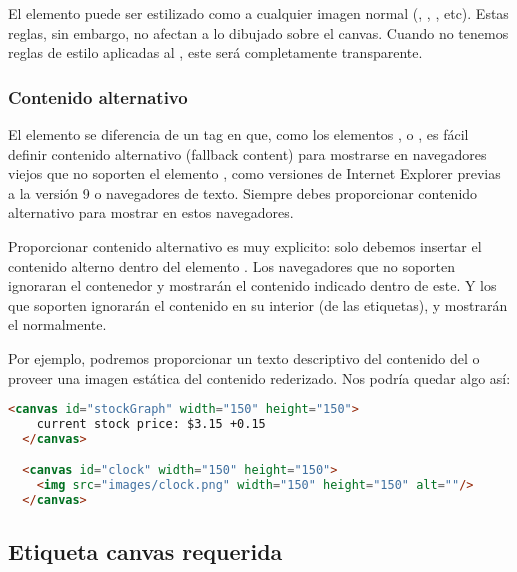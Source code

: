 El elemento  puede ser estilizado como a cualquier imagen normal (, , , etc). Estas reglas, sin embargo, no afectan a lo dibujado sobre el canvas. Cuando no tenemos reglas de estilo aplicadas al , este será completamente transparente.


\subsubsection{Contenido alternativo}

El elemento  se diferencia de un tag  en que, como los elementos ,  o , es fácil definir contenido alternativo (fallback content) para mostrarse en navegadores viejos que no soporten el elemento , como versiones de Internet Explorer previas a la versión 9 o navegadores de texto. Siempre debes proporcionar contenido alternativo para mostrar en estos navegadores.

Proporcionar contenido alternativo es muy explicito: solo debemos insertar el contenido alterno dentro del elemento . Los navegadores que no soporten  ignoraran el contenedor y mostrarán el contenido indicado dentro de este. Y los que soporten  ignorarán el contenido en su interior (de las etiquetas), y mostrarán el  normalmente.

Por ejemplo, podremos proporcionar un texto descriptivo del contenido del  o proveer una imagen estática del contenido rederizado. Nos podría quedar algo así:

\vspace{0.5cm} %
\begin{lstlisting}[language=HTML, style=mystyle2]
  <canvas id="stockGraph" width="150" height="150">
    current stock price: $3.15 +0.15
  </canvas>

  <canvas id="clock" width="150" height="150">
    <img src="images/clock.png" width="150" height="150" alt=""/>
  </canvas>
\end{lstlisting}

\subsection{Etiqueta canvas requerida}

